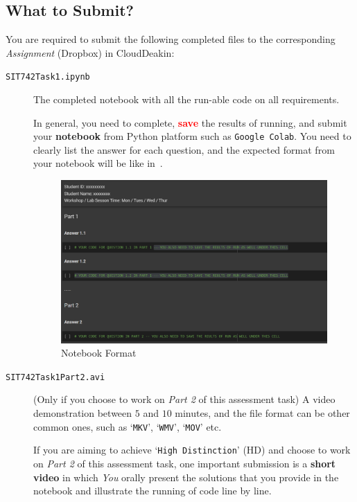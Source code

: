 \documentclass[a4paper]{article}
\begin{document}
    
\subsection*{What to Submit?}\label{sec:submit}

You are required to 
submit the following completed files to 
the corresponding \emph{Assignment} (Dropbox) in CloudDeakin:
\begin{description} 
\item[\texttt{SIT742Task1.ipynb}] 
The completed notebook with all the run-able code on all requirements.

In general, 
you need to complete, \textcolor{red}{\textbf{save}} the results of running, 
and submit your \textbf{notebook} 
from Python platform such as \texttt{Google Colab}. 
You need to clearly list the answer for each question,
and the expected format from your notebook will 
be like in~. 

\begin{figure}[H]
    \centering
    \includegraphics[width=0.8\columnwidth]{figure/assigment1.png}
    \caption{Notebook Format}
    \label{fig:format}
\end{figure}
    

\item[\texttt{SIT742Task1Part2.avi}] (Only if you choose to work on \emph{Part 2} of this assessment task)
A video demonstration between $5$ and $10$ minutes,
and the file format can be other common ones,
such as `\texttt{MKV}', `\texttt{WMV}', `\texttt{MOV}' etc. 

If you are aiming to achieve `\texttt{High Distinction}' (HD) and choose to work on \emph{Part 2} of this assessment task,
one important submission is a \textbf{short video} 
in which \emph{You} orally present the solutions 
that you provide in the notebook 
and illustrate the running of code line by line.


\end{description}
\end{document}
